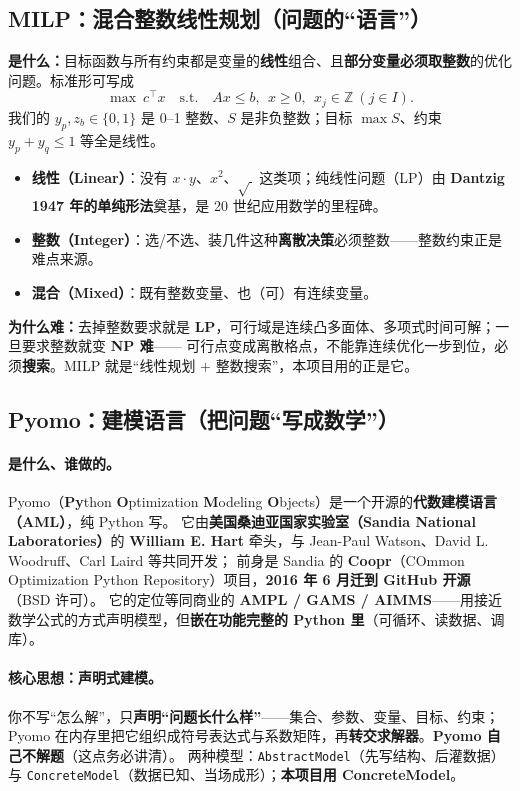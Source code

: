\documentclass[11pt]{ctexart}
\newcommand{\code}[1]{\texttt{#1}}
\begin{document}
\subsection{MILP：混合整数线性规划（问题的“语言”）}
\textbf{是什么：}目标函数与所有约束都是变量的\textbf{线性}组合、且\textbf{部分变量必须取整数}的优化问题。标准形可写成
\[
\max\ c^\top x \quad \text{s.t.}\quad Ax\le b,\ \ x\ge 0,\ \ x_j\in\mathbb{Z}\ (j\in I).
\]
我们的 $y_p,z_b\in\{0,1\}$ 是 0--1 整数、$S$ 是非负整数；目标 $\max S$、约束 $y_p+y_q\le1$ 等全是线性。
\begin{itemize}[leftmargin=1.8em,itemsep=1pt]
  \item \textbf{线性（Linear）}：没有 $x\cdot y$、$x^2$、$\sqrt{\,}$ 这类项；纯线性问题（LP）由 \textbf{Dantzig 1947 年的单纯形法}奠基，是 20 世纪应用数学的里程碑。
  \item \textbf{整数（Integer）}：选/不选、装几件这种\textbf{离散决策}必须整数——整数约束正是难点来源。
  \item \textbf{混合（Mixed）}：既有整数变量、也（可）有连续变量。
\end{itemize}
\textbf{为什么难：}去掉整数要求就是 \textbf{LP}，可行域是连续凸多面体、多项式时间可解；一旦要求整数就变 \textbf{NP 难}——
可行点变成离散格点，不能靠连续优化一步到位，必须\textbf{搜索}。MILP 就是“线性规划 $+$ 整数搜索”，本项目用的正是它。

\subsection{Pyomo：建模语言（把问题“写成数学”）}
\paragraph{是什么、谁做的。}Pyomo（\textbf{Py}thon \textbf{O}ptimization \textbf{M}odeling \textbf{O}bjects）是一个开源的\textbf{代数建模语言（AML）}，纯 Python 写。
它由\textbf{美国桑迪亚国家实验室（Sandia National Laboratories）}的 \textbf{William E. Hart} 牵头，与 Jean-Paul Watson、David L. Woodruff、Carl Laird 等共同开发；
前身是 Sandia 的 \textbf{Coopr}（COmmon Optimization Python Repository）项目，\textbf{2016 年 6 月迁到 GitHub 开源}（BSD 许可）。
它的定位等同商业的 \textbf{AMPL / GAMS / AIMMS}——用接近数学公式的方式声明模型，但\textbf{嵌在功能完整的 Python 里}（可循环、读数据、调库）。
\paragraph{核心思想：声明式建模。}你不写“怎么解”，只\textbf{声明“问题长什么样”}——集合、参数、变量、目标、约束；
Pyomo 在内存里把它组织成符号表达式与系数矩阵，再\textbf{转交求解器}。\textbf{Pyomo 自己不解题}（这点务必讲清）。
两种模型：\code{AbstractModel}（先写结构、后灌数据）与 \code{ConcreteModel}（数据已知、当场成形）；\textbf{本项目用 ConcreteModel}。
\end{document}
